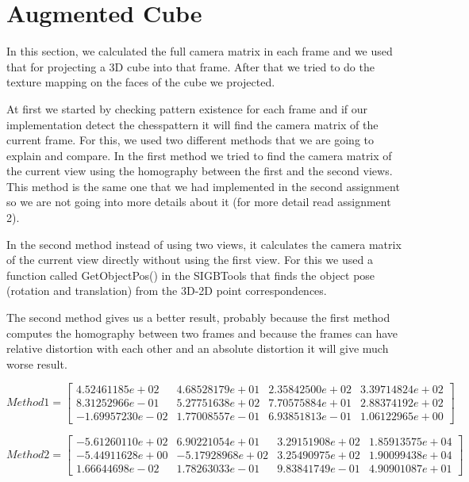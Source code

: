 \section{Augmented Cube}
In this section, we calculated the full camera matrix in each frame and we used that for projecting a 3D cube into that frame. After that we tried to do the texture mapping on the faces of the cube we projected.

At first we started by checking pattern existence for each frame and if our implementation detect the chesspattern it will ﬁnd the camera matrix of the current frame. For this, we used two different methods that we are going to explain and compare. In the first method we tried to find the camera matrix of the current view using the homography between the first and the second views. This method is the same one that we had implemented in the second assignment so we are not going into more details about it (for more detail read assignment 2).

In the second method instead of using two views, it calculates the camera matrix of the current view directly without using the first view. For this we used a function called GetObjectPos() in the SIGBTools that ﬁnds the object pose (rotation and translation) from the 3D-2D point correspondences.

The second method gives us a better result, probably because the first method computes the homography between two frames and because the frames can have relative distortion with each other and an absolute distortion it will give much worse result.

\begin{equation}
Method 1 = 
  	\begin{bmatrix}
			4.52461185e+02 &  4.68528179e+01 &  2.35842500e+02 &  3.39714824e+02 \\
			8.31252966e-01 &  5.27751638e+02 &  7.70575884e+01 &  2.88374192e+02 \\
			-1.69957230e-02 &  1.77008557e-01 &  6.93851813e-01 &  1.06122965e+00
		\end{bmatrix}
		\label{eq:cameramatrix1}
\end{equation}

\begin{equation}
Method 2 = 
		\begin{bmatrix}
			-5.61260110e+02 &  6.90221054e+01 &  3.29151908e+02 &  1.85913575e+04 \\
			-5.44911628e+00 & -5.17928968e+02 &  3.25490975e+02 &  1.90099438e+04 \\
			1.66644698e-02 &  1.78263033e-01 &  9.83841749e-01 &  4.90901087e+01
		\end{bmatrix}
		\label{eq:cameramatrix2}
\end{equation}

